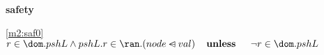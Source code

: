 \textbf{safety}
\begin{block}
\item[ \eqref{m2:saf0} ]$r \in \dom.pshL \land pshL.r \in \ran.(node \domsub val)  \textbf{\quad unless \quad} \neg r \in \dom.pshL $ %
\end{block}
